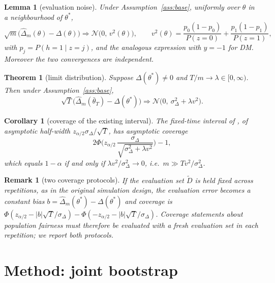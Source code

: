 \documentclass[10pt,twocolumn]{article}
\newtheorem{theorem}{Theorem}
\newtheorem{lemma}{Lemma}
\newtheorem{corollary}{Corollary}
\newtheorem{remark}{Remark}
\newcommand{\dhat}{\hat\Delta}
\newcommand{\tbar}{\bar\theta}
\newcommand{\Dt}{\tilde D}
\begin{document}
\begin{lemma}[evaluation noise]
\label{lem:eval}
Under Assumption~\ref{ass:base}, uniformly over $\theta$ in a neighbourhood of $\theta^*$,
\[
\sqrt m\big(\dhat_m(\theta)-\Delta(\theta)\big)\Rightarrow\mathcal N\!\big(0,\,v^2(\theta)\big),
\qquad
v^2(\theta)=\frac{p_0(1-p_0)}{P(z=0)}+\frac{p_1(1-p_1)}{P(z=1)},
\]
with $p_j=P(h=1\mid z=j)$, and the analogous expression with $y=-1$ for DM.  Moreover the two
convergences are independent.
\end{lemma}

\begin{theorem}[limit distribution]
\label{thm:limit}
Suppose $\Delta(\theta^*)\neq0$ and $T/m\to\lambda\in[0,\infty)$.  Then under
Assumption~\ref{ass:base},
\[
\sqrt T\big(\dhat_m(\tbar_T)-\Delta(\theta^*)\big)\Rightarrow
\mathcal N\big(0,\ \sigma^2_\Delta+\lambda v^2\big).
\]
\end{theorem}

\begin{corollary}[coverage of the existing interval]
\label{cor:coverage}
The fixed-time interval of \citet{roy2026uq}, of asymptotic half-width
$z_{\alpha/2}\sigma_\Delta/\sqrt T$, has asymptotic coverage
\[
2\Phi\!\Big(z_{\alpha/2}\,\frac{\sigma_\Delta}{\sqrt{\sigma^2_\Delta+\lambda v^2}}\Big)-1,
\]
which equals $1-\alpha$ if and only if $\lambda v^2/\sigma_\Delta^2\to0$, i.e.\
$m\gg T v^2/\sigma_\Delta^2$.
\end{corollary}

\begin{remark}[two coverage protocols]
\label{rem:protocol}
If the evaluation set $\Dt$ is held fixed across repetitions, as in the original simulation design,
the evaluation error becomes a constant bias $b=\dhat_m(\theta^*)-\Delta(\theta^*)$ and coverage is
$\Phi(z_{\alpha/2}-|b|\sqrt T/\sigma_\Delta)-\Phi(-z_{\alpha/2}-|b|\sqrt T/\sigma_\Delta)$.
Coverage statements about population fairness must therefore be evaluated with a fresh evaluation
set in each repetition; we report both protocols.
\end{remark}

\section{Method: joint bootstrap}
\label{sec:method}
\end{document}
